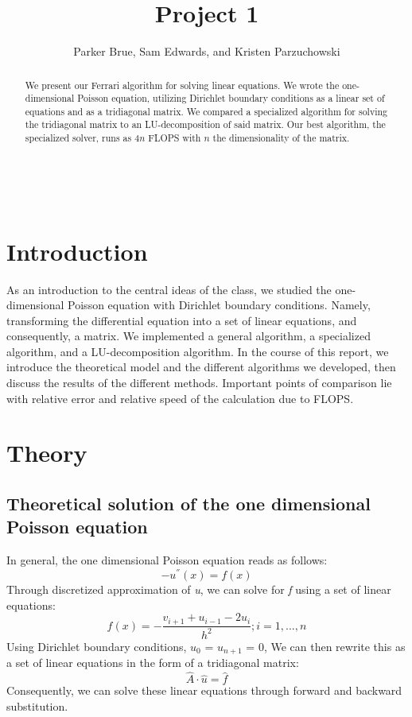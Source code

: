 \documentclass[10pt,showpacs,preprintnumbers,footinbib,amsmath,amssymb,aps,prl,twocolumn,groupedaddress,superscriptaddress,showkeys]{revtex4-1}
\begin{document}
\title{Project 1}
\author{Parker Brue, Sam Edwards, and Kristen Parzuchowski}
\begin{abstract}
We present our Ferrari algorithm for solving linear equations. We wrote the one-dimensional Poisson equation, utilizing Dirichlet boundary conditions as a linear set of equations and as a tridiagonal matrix. We compared a specialized algorithm for solving the tridiagonal matrix to an LU-decomposition of said matrix.  Our best algorithm, the specialized solver, runs as $4n$ FLOPS with $n$ the dimensionality of the matrix.
\end{abstract}
\maketitle
\
\section{Introduction}
As an introduction to the central ideas of the class, we studied the one-dimensional Poisson equation with Dirichlet boundary conditions. Namely, transforming the differential equation into a set of linear equations, and consequently, a matrix. We implemented a general algorithm, a specialized algorithm, and a LU-decomposition algorithm. In the course of this report, we introduce the theoretical model and the different algorithms  we developed, then discuss the results of the different methods. Important points of comparison lie with relative error and relative speed of the calculation due to FLOPS. 

\section{Theory}
	\subsection{Theoretical solution of the one dimensional Poisson equation}	
In general, the one dimensional Poisson equation reads as follows: \begin{equation} -u^{''}(x) = f(x)     \end{equation}  Through discretized approximation of {\it u}, we can solve for {\it f} using a set of linear equations: \begin{equation}
	f(x)=-\frac{v_{i+1}+u_{i-1}-2u_{i}}{h^{2}}      ;      i=1,...,n
	\end{equation}
Using Dirichlet boundary conditions, $u_{0}$  = $u_{n+1}$ = 0,  We can then rewrite this as a set of linear equations in the form of a tridiagonal matrix: \begin{equation}	
	\hat{A} \cdot \hat{u} = \hat{f}
	\end{equation}
Consequently, we can solve these linear equations through forward and backward substitution.
\end{document}
